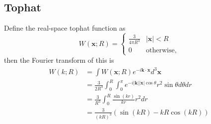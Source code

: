 \subsection{Tophat}

Define the real-space tophat function as
\begin{equation}
    W(\bm{x}; R) = 
    \begin{cases}
        \frac{3}{4 \pi R^3} & |\bm{x}| < R \\
        0 & \text{otherwise},
    \end{cases}
\end{equation}
then the Fourier transform of this is
\begin{align}
    \hat{W}(k;R) &= \int W(\bm{x};R) e^{-i \bm{k} \cdot \bm{x}} d^3 \bm{x} \\
    &= \frac{3}{2R^3} \int_0^R \int_0^\pi e^{-i |\bm{k}| |\bm{x}| \cos\theta} r^2 \sin\theta d\theta dr \\
    &= \frac{3}{R^3} \int_0^R \frac{\sin(kr)}{kr} r^2 dr \\
    &= \frac{3}{(kR)^3} (\sin(k R) - k R \cos(k R))
\end{align}
